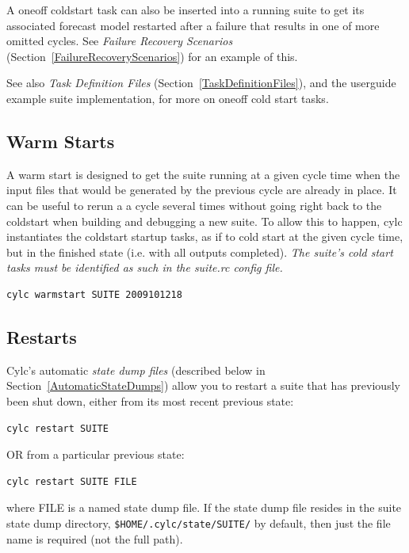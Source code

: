 \documentclass[11pt,a4paper]{article}
\begin{document}
A oneoff coldstart task can also be inserted into a running suite to get
its associated forecast model restarted after a failure that results in
one of more omitted cycles. See {\em Failure Recovery Scenarios}
(Section~\ref{FailureRecoveryScenarios}) for an example of this. 

See also {\em Task Definition Files}
(Section~\ref{TaskDefinitionFiles}), and the userguide example suite
implementation, for more on oneoff cold start tasks.

\subsection{Warm Starts}

A warm start is designed to get the suite running at a given cycle time
when the input files that would be generated by the previous cycle are
already in place. It can be useful to rerun a a cycle several times
without going right back to the coldstart when building and debugging a
new suite. To allow this to happen, cylc instantiates the coldstart
startup tasks, as if to cold start at the given cycle time, but in the
finished state (i.e. with all outputs completed).  {\em The suite's cold
start tasks must be identified as such in the suite.rc config file.} 

\begin{lstlisting}
cylc warmstart SUITE 2009101218
\end{lstlisting}


\subsection{Restarts}
\label{Restarts}

Cylc's automatic {\em state dump files} (described below in
Section~\ref{AutomaticStateDumps}) allow you to restart a suite
that has previously been shut down, either from 
its most recent previous state:

\begin{lstlisting}
cylc restart SUITE
\end{lstlisting}

OR from a particular previous state:

\begin{lstlisting}
cylc restart SUITE FILE
\end{lstlisting}

where FILE is a named state dump file. If the state dump file resides in
the suite state dump directory,  
\lstinline=$HOME/.cylc/state/SUITE/= by default, then just the file
name is required (not the full path).
\end{document}

